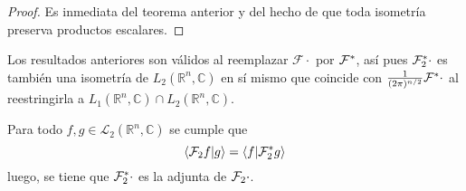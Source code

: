 \documentclass[12pt]{report}
\theoremstyle{largebreak}
\newcommand\pint[2]{\ensuremath{\langle#1| #2\rangle}}
\newcommand{\fou}[1]{\ensuremath{\mathcal{F}#1}}
\begin{document}
    \begin{proof}
        Es inmediata del teorema anterior y del hecho de que toda isometría preserva productos escalares.
    \end{proof}

    \begin{obs}
        Los resultados anteriores son válidos al reemplazar $\fou{\cdot}$ por $\fou^*{}$, así pues $\fou_2^*{\cdot}$ es también una isometría de $L_2(\mathbb{R}^n,\mathbb{C})$ en sí mismo que coincide con $\frac{1}{(2\pi)^{ n/2}}\fou^*{\cdot}$ al reestringirla a $L_1(\mathbb{R}^n,\mathbb{C})\cap L_2(\mathbb{R}^n,\mathbb{C})$.
    \end{obs}

    \begin{theor}
        Para todo $f,g\in\mathcal{L}_2(\mathbb{R}^n,\mathbb{C})$ se cumple que
        \begin{equation*}
            \pint{\fou_2{f}}{g}=\pint{f}{\fou_2^*{g}}
        \end{equation*}
        luego, se tiene que $\fou_2^*{\cdot}$ es la adjunta de $\fou_2{\cdot}$.
    \end{theor}
\end{document}
